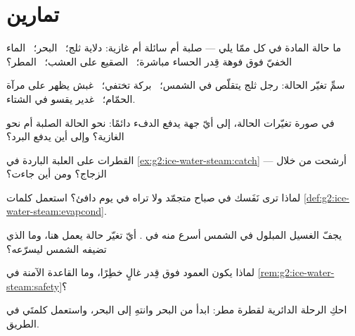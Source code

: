 \section{تمارين}

\begin{exercise}[$\star$]\label{exo:g2:ice-water-steam:1}
ما حالة المادة في كل ممّا يلي --- صلبة أم سائلة أم غازية:
دلاية ثلج؛ \ البحر؛ \ الماء الخفيّ فوق فوهة قِدر الحساء مباشرة؛
\ الصقيع على العشب؛ \ المطر؟
\end{exercise}

\begin{exercise}[$\star$]\label{exo:g2:ice-water-steam:2}
سمِّ تغيّر الحالة: رجل ثلج يتقلّص في الشمس؛ \ بركة تختفي؛
\ غبش يظهر على مرآة الحمّام؛ \ غدير يقسو في الشتاء.
\end{exercise}

\begin{exercise}[$\star$]\label{exo:g2:ice-water-steam:3}
في صورة تغيّرات الحالة، إلى أيّ جهة يدفع الدفء دائمًا: نحو
الحالة الصلبة أم نحو الغازية؟ وإلى أين يدفع البرد؟
\end{exercise}

\begin{exercise}[$\star$]\label{exo:g2:ice-water-steam:4}
القطرات على العلبة الباردة في \cref{ex:g2:ice-water-steam:catch}
--- أرشحت من خلال الزجاج؟ ومن أين جاءت؟
\end{exercise}

\begin{exercise}[$\star$]\label{exo:g2:ice-water-steam:5}
لماذا ترى نَفَسك في صباح متجمّد ولا تراه في يوم دافئ؟ استعمل
كلمات \cref{def:g2:ice-water-steam:evapcond}.
\end{exercise}

\begin{exercise}[$\star$]\label{exo:g2:ice-water-steam:6}
يجفّ الغسيل المبلول في الشمس أسرع منه في . أيّ تغيّر حالة
يعمل هنا، وما الذي تضيفه الشمس ليسرّعه؟
\end{exercise}

\begin{exercise}[$\star$]\label{exo:g2:ice-water-steam:7}
لماذا يكون العمود فوق قِدر غالٍ خطِرًا، وما القاعدة الآمنة في
\cref{rem:g2:ice-water-steam:safety}؟
\end{exercise}

\begin{exercise}[$\star$]\label{exo:g2:ice-water-steam:8}
احكِ الرحلة الدائرية لقطرة مطر: ابدأ من البحر وانتهِ إلى البحر،
واستعمل كلمتَي   في الطريق.
\end{exercise}

